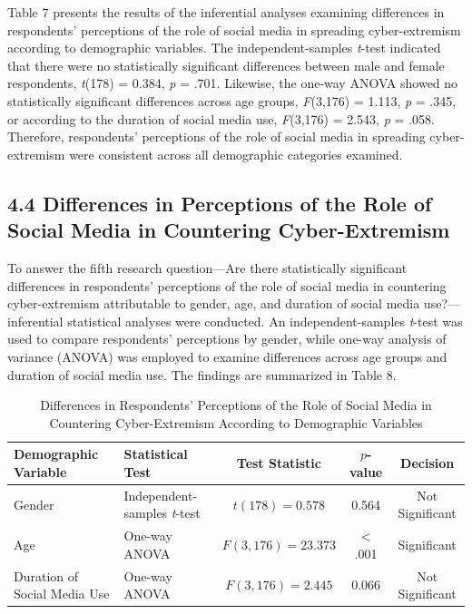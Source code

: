 \documentclass[10pt]{NSP1}
\begin{document}
	Table 7 presents the results of the inferential analyses examining differences in respondents' perceptions of the role of social media in spreading cyber-extremism according to demographic variables. The independent-samples \textit{t}-test indicated that there were no statistically significant differences between male and female respondents, \textit{t}(178) = 0.384, \textit{p} = .701. Likewise, the one-way ANOVA showed no statistically significant differences across age groups, \textit{F}(3,176) = 1.113, \textit{p} = .345, or according to the duration of social media use, \textit{F}(3,176) = 2.543, \textit{p} = .058. Therefore, respondents' perceptions of the role of social media in spreading cyber-extremism were consistent across all demographic categories examined.
	
	\subsection*{4.4 Differences in Perceptions of the Role of Social Media in Countering Cyber-Extremism}
	
	To answer the fifth research question—Are there statistically significant differences in respondents' perceptions of the role of social media in countering cyber-extremism attributable to gender, age, and duration of social media use?—inferential statistical analyses were conducted. An independent-samples \textit{t}-test was used to compare respondents' perceptions by gender, while one-way analysis of variance (ANOVA) was employed to examine differences across age groups and duration of social media use. The findings are summarized in Table 8.
	
	\setcounter{table}{7}
	\begin{table}[H]
		\centering
		\caption{Differences in Respondents' Perceptions of the Role of Social Media in Countering Cyber-Extremism According to Demographic Variables}
		\small
		\renewcommand{\arraystretch}{1.3}
		\begin{tabular}{|l|l|c|c|c|}
			\hline
			\textbf{Demographic Variable} & \textbf{Statistical Test} & \textbf{Test Statistic} & \textbf{$p$-value} & \textbf{Decision} \\
			\hline
			Gender & Independent-samples \textit{t}-test & $t(178) = 0.578$ & 0.564 & Not Significant \\
			Age & One-way ANOVA & $F(3,176) = 23.373$ & $<$ .001 & Significant \\
			Duration of Social Media Use & One-way ANOVA & $F(3,176) = 2.445$ & 0.066 & Not Significant \\
			\hline
		\end{tabular}
	\end{table}
	
\end{document}
